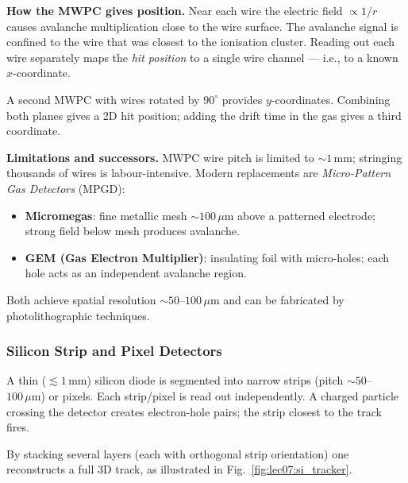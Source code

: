 \textbf{How the MWPC gives position.}
Near each wire the electric field $\propto 1/r$ causes avalanche multiplication
close to the wire surface.  The avalanche signal is confined to the wire that
was closest to the ionisation cluster.  Reading out each wire separately maps
the \emph{hit position} to a single wire channel — i.e., to a known $x$-coordinate.

A second MWPC with wires rotated by $90^\circ$ provides $y$-coordinates.
Combining both planes gives a 2D hit position; adding the drift time in the gas
gives a third coordinate.

\textbf{Limitations and successors.}
MWPC wire pitch is limited to $\sim 1\,\text{mm}$; stringing thousands of wires
is labour-intensive.  Modern replacements are \emph{Micro-Pattern Gas Detectors}
(MPGD):
\begin{itemize}
  \item \textbf{Micromegas}: fine metallic mesh $\sim 100\,\mu\text{m}$ above a
  patterned electrode; strong field below mesh produces avalanche.
  \item \textbf{GEM (Gas Electron Multiplier)}: insulating foil with micro-holes;
  each hole acts as an independent avalanche region.
\end{itemize}
Both achieve spatial resolution $\sim 50$–$100\,\mu\text{m}$ and can be
fabricated by photolithographic techniques.

\subsubsection*{Silicon Strip and Pixel Detectors}

A thin ($\lesssim 1\,\text{mm}$) silicon diode is segmented into narrow
strips (pitch $\sim 50$–$100\,\mu\text{m}$) or pixels.  Each strip/pixel
is read out independently.  A charged particle crossing the detector creates
electron-hole pairs; the strip closest to the track fires.

By stacking several layers (each with orthogonal strip orientation) one
reconstructs a full 3D track, as illustrated in Fig.~\ref{fig:lec07:si_tracker}.


